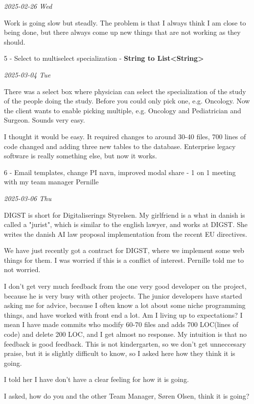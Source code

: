 \documentclass[../main.tex]{subfiles}
\begin{document}
\textit{2025-02-26 Wed}

Work is going slow but steadly. The problem is that I always think I am
close to being done, but there always come up new things that are not
working as they should. 

5 - Select to multiselect specialization - \textbf{String to
List\textless String\textgreater{}}

\textit{2025-03-04 Tue}

There was a select box where physician can select the specialization of the study of the people doing the study. Before you could only pick one, e.g. Oncology. Now the client wants to enable picking multiple, e.g. Oncology and Pediatrician and Surgeon. Sounds very easy.

I thought it would be easy. It required changes to around 30-40 files, 700 lines of code changed and adding three new tables to the database. Enterprise legacy software is really something else, but now it
works. 

6 - Email templates, change PI navn, improved modal share - 1 on 1
meeting with my team manager Pernille

\textit{2025-03-06 Thu}

DIGST is short for Digitaliserings Styrelsen. My girlfriend is a what in danish is called a "jurist", which is similar to the english lawyer, and works at DIGST. She writes the danish AI law proposal implementation from the recent EU directives.

We have just recently got a contract for DIGST, where we implement some web things for them. I was worried if this is a conflict of interest. Pernille told me to not worried.

I don't get very much feedback from the one very good developer on the project, because he is very busy with other projects. The junior developers have started asking me for advice, because I often know a lot about some niche programming things, and have worked with front end a lot. Am I living up to expectations? I mean I have made commits who modify 60-70 files and adds 700 LOC(lines of code) and delete 200 LOC, and I get almost no response. My intuition is that no feedback is good feedback. This is not kindergarten, so we don't get unneccesary praise, but it is slightly difficult to know, so I asked here how they think it is going.

I told her I have don't have a clear feeling for how it is going.

I asked, how do you and the other Team Manager, Søren Olsen, think it is going?
\end{document}
